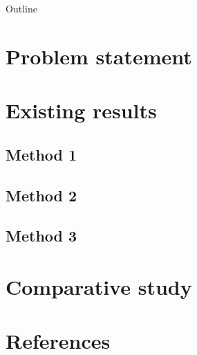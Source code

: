 
\begin{frame}
    \titlepage 
\end{frame}

\begin{frame}{Outline}
    \tableofcontents
\end{frame}

\section{Problem statement}
\section{Existing results}
    \subsection{Method 1}
    \subsection{Method 2}
    \subsection{Method 3}
\section{Comparative study}
\section*{References}

\begin{frame}
\end{frame}